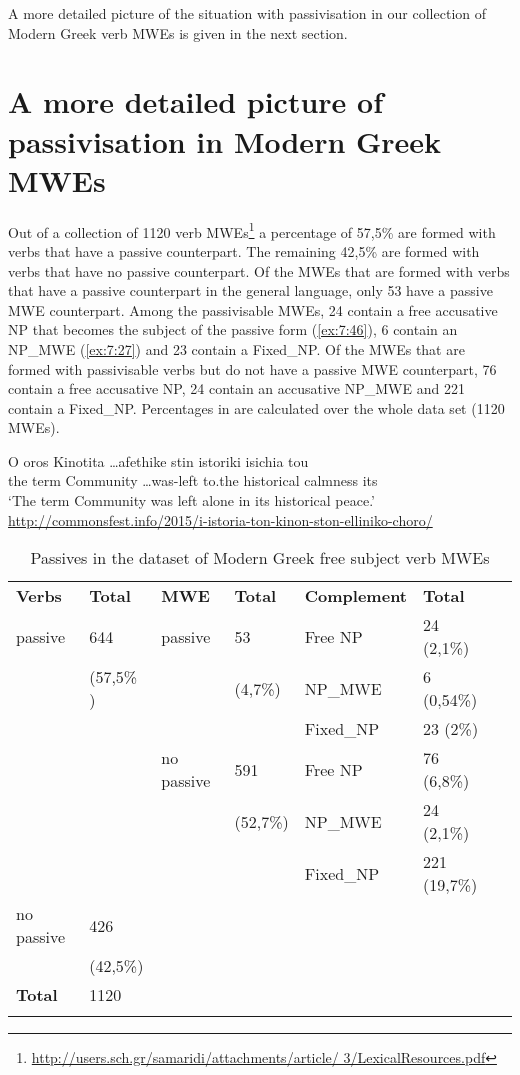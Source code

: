 \documentclass[output=paper]{langsci/langscibook}
\begin{document}
A more detailed picture of the situation with passivisation in our collection of Modern Greek verb MWEs is given in the next section.

\section{A more detailed picture of passivisation in Modern Greek MWEs}
\label{sec:4}

Out of a collection of 1120 verb MWEs\footnote{\url{http://users.sch.gr/samaridi/attachments/article/
3/LexicalResources.pdf}} a percentage of   57,5\%  are formed with verbs that have a passive counterpart. The remaining 42,5\%  are formed with verbs that have no  passive counterpart. Of the MWEs that are formed with verbs that have a passive counterpart in the general language, only 53 have a passive MWE counterpart. Among the passivisable MWEs, 24 contain a free accusative NP that becomes the subject of the passive form (\ref{ex:7:46}), 6 contain an NP\_MWE (\ref{ex:7:27}) and 23 contain a Fixed\_NP. Of the MWEs that are formed with passivisable verbs but do not have a passive MWE counterpart, 76 contain a free accusative NP, 24 contain an accusative NP\_MWE and 221 contain a Fixed\_NP. Percentages in  are calculated over the whole data set (1120 MWEs).

\begin{exe}
\ex \label{ex:7:46}
\gll O oros Kinotita \ldots afethike stin istoriki isichia tou\\
     the term Community \ldots  was-left to.the historical calmness its\\
\glt `The term Community was left alone in its historical peace.'\\
\url{http://commonsfest.info/2015/i-istoria-ton-kinon-ston-elliniko-choro/} 
\end{exe}


\begin{table}
\begin{tabular}{lllllll}
\lsptoprule
\textbf{Verbs} & \textbf{Total} & \textbf{MWE} & \textbf{Total} & \textbf{Complement} & \textbf{Total} \\
passive & 644  & passive & 53  & Free NP & 24 (2,1\%) \\
& (57,5\% ) &  & (4,7\%) & NP\_MWE & 6 (0,54\%) \\
&  &  &  & Fixed\_NP & 23 (2\%) &\\
&  & { no passive} &  591  & Free NP & 76 (6,8\%) \\
&  &  & (52,7\%) & NP\_MWE & 24 (2,1\%) & \\
&  &  &  & Fixed\_NP & 221 (19,7\%) \\
 no passive & 426  &  &  &  &   \\
 & (42,5\%) & &  &  &  &   \\ \hline
\textbf{Total}   & 1120 &  &  &  &  \\
\lspbottomrule
\end{tabular}
\caption{Passives in the dataset of Modern Greek free subject verb MWEs}
\label{tab:2}
\end{table}
\end{document}
